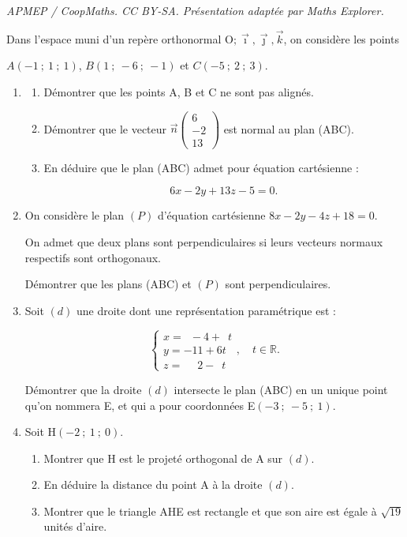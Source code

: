 \documentclass[10pt]{article}
\providecommand{\R}{\mathbb{R}}
\providecommand{\Oijk}{\(\mathrm{O};\vec{\imath},\vec{\jmath},\vec{k}\)}
\begin{document}
\noindent\textit{APMEP / CoopMaths. CC BY-SA. Présentation adaptée par Maths Explorer.}\par\medskip
Dans l'espace muni d'un repère orthonormal \Oijk, on considère les points 

$A(-1~;~1~;~1)$, $B(1~;~-6~;~-1)$ et $C(-5~;~2~;~3)$.

\medskip

\begin{enumerate}
\item[1.] 
	\begin{enumerate}[label=\alph*.]
		\item Démontrer que les points A, B et C ne sont pas alignés.
		\item Démontrer que le vecteur $\vec{n}\begin{pmatrix} 6 \\ -2 \\ 13 \end{pmatrix}$ est normal au plan (ABC).
		\item En déduire que le plan (ABC) admet pour équation cartésienne :

\[6x - 2y + 13z - 5 = 0.\]
	\end{enumerate}

\item On considère le plan $(P)$ d'équation cartésienne $8x - 2y - 4z + 18 = 0$.

On admet que deux plans sont perpendiculaires si leurs vecteurs normaux respectifs sont orthogonaux.

Démontrer que les plans (ABC) et $(P)$ sont perpendiculaires.
\item Soit $(d)$ une droite dont une représentation paramétrique est :

\[\begin{cases}
x = \phantom{1}-4 + \phantom{1}t \\
y = -11 + 6t \\
z = \phantom{-1}2 - \phantom{1}t
\end{cases}, \quad t \in \R.\]

Démontrer que la droite $(d)$ intersecte le plan (ABC) en un unique point qu'on nommera E, et qui a pour coordonnées E$(-3~;~-5~;~1)$.

\item[4.] Soit H$(-2~;~1~;~0)$.
	\begin{enumerate}[label=\alph*.]
		\item Montrer que H est le projeté orthogonal de A sur $(d)$.
		\item En déduire la distance du point A à la droite $(d)$.
		\item Montrer que le triangle AHE est rectangle et que son aire est égale à $\sqrt{19}$ unités d'aire.
	\end{enumerate}
\end{enumerate}

\bigskip
\end{document}
